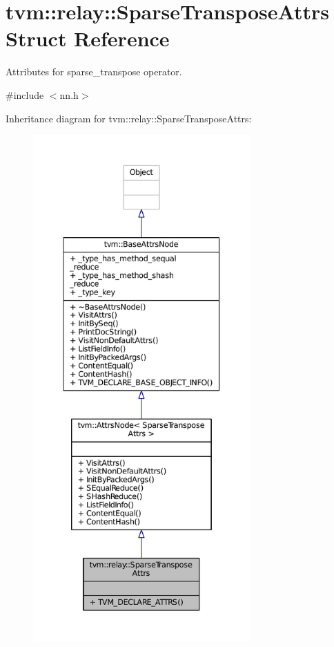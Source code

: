 \hypertarget{structtvm_1_1relay_1_1SparseTransposeAttrs}{}\section{tvm\+:\+:relay\+:\+:Sparse\+Transpose\+Attrs Struct Reference}
\label{structtvm_1_1relay_1_1SparseTransposeAttrs}


Attributes for sparse\+\_\+transpose operator.  




{\ttfamily \#include $<$nn.\+h$>$}



Inheritance diagram for tvm\+:\+:relay\+:\+:Sparse\+Transpose\+Attrs\+:
\nopagebreak
\begin{figure}[H]
\begin{center}
\leavevmode
\includegraphics[height=550pt]{structtvm_1_1relay_1_1SparseTransposeAttrs__inherit__graph}
\end{center}
\end{figure}


